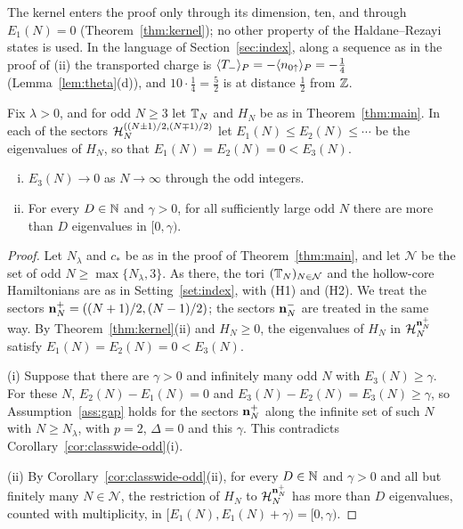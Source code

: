 The kernel enters the proof only through its dimension, ten, and through $E_1(N)=0$ (Theorem~\ref{thm:kernel}); no
other property of the Haldane--Rezayi states is used. In the language of Section~\ref{sec:index}, along a sequence as
in the proof of (ii) the transported charge is $\langle T_-\rangle_{P}=-\langle n_{0{\uparrow}}\rangle_{P}=-\frac14$ (Lemma~\ref{lem:theta}(d)), and
$10\cdot\frac14=\frac52$ is at distance $\frac12$ from $\mathbb{Z}$.

\begin{corollary}[odd $N$]\label{cor:oddN}
Fix $\lambda>0$, and for odd $N\ge3$ let $\mathbb{T}_N$ and $H_N$ be as in Theorem~\ref{thm:main}. In each of the sectors
$\mathcal{H}_N^{((N\pm1)/2,(N\mp1)/2)}$ let $E_1(N)\le E_2(N)\le\cdots$ be the eigenvalues of $H_N$, so that
$E_1(N)=E_2(N)=0<E_3(N)$.
\begin{enumerate}[(i)]
\item $E_3(N)\to0$ as $N\to\infty$ through the odd integers.
\item For every $D\in\mathbb{N}$ and $\gamma>0$, for all sufficiently large odd $N$ there are more than $D$ eigenvalues in
$[0,\gamma)$.
\end{enumerate}
\end{corollary}

\begin{proof}
Let $N_\lambda$ and $c_*$ be as in the proof of Theorem~\ref{thm:main}, and let $\mathcal N$ be the set of odd
$N\ge\max\{N_\lambda,3\}$. As there, the tori $(\mathbb{T}_N)_{N\in\mathcal N}$ and the hollow-core Hamiltonians are as in
Setting~\ref{set:index}, with (H1) and (H2). We treat the sectors $\mathbf{n}^+_N=((N+1)/2,(N-1)/2)$; the sectors $\mathbf{n}^-_N$ are
treated in the same way. By Theorem~\ref{thm:kernel}(ii) and $H_N\ge0$, the eigenvalues of $H_N$ in $\mathcal{H}_N^{\mathbf{n}^+_N}$
satisfy $E_1(N)=E_2(N)=0<E_3(N)$.

(i) Suppose that there are $\gamma>0$ and infinitely many odd $N$ with $E_3(N)\ge\gamma$. For these $N$,
$E_2(N)-E_1(N)=0$ and $E_3(N)-E_2(N)=E_3(N)\ge\gamma$, so Assumption~\ref{ass:gap} holds for the sectors $\mathbf{n}^+_N$ along the
infinite set of such $N$ with $N\ge N_\lambda$, with $p=2$, $\Delta=0$ and this $\gamma$. This contradicts
Corollary~\ref{cor:classwide-odd}(i).

(ii) By Corollary~\ref{cor:classwide-odd}(ii), for every $D\in\mathbb{N}$ and $\gamma>0$ and all but finitely many
$N\in\mathcal N$, the restriction of $H_N$ to $\mathcal{H}_N^{\mathbf{n}^+_N}$ has more than $D$ eigenvalues, counted with multiplicity,
in $[E_1(N),E_1(N)+\gamma)=[0,\gamma)$.
\end{proof}

